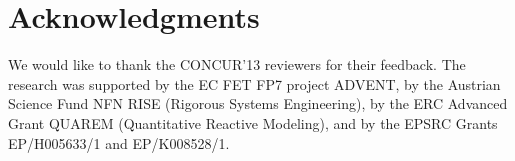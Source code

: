 \documentclass{LMCS}
\begin{document}
\section*{Acknowledgments}
We would like to thank the CONCUR'13 reviewers for their feedback. 
The research was supported by the EC FET FP7 project ADVENT, by the Austrian
Science Fund NFN RISE (Rigorous Systems Engineering), by the ERC Advanced
Grant QUAREM (Quantitative Reactive Modeling), and by the EPSRC Grants EP/H005633/1 and EP/K008528/1.



\end{document}
